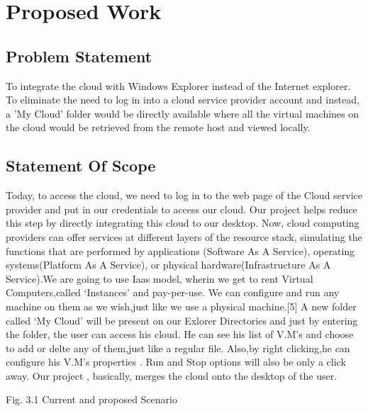 \chapter{Proposed Work}

\section{Problem Statement}
To integrate the cloud with Windows Explorer instead of the Internet explorer. To eliminate the need to log in into a cloud service provider account and instead, a 'My Cloud' folder would be directly available where all the virtual machines on the cloud would be retrieved from the remote host and viewed locally.



\section{Statement Of Scope}

  Today, to access the cloud, we need to log in to the web page of the Cloud service provider and put in our credentials to access our cloud. Our project helps reduce this step by directly integrating this cloud to our desktop.
Now, cloud computing providers can offer services at different layers of the resource stack, simulating the functions that are performed by applications (Software As A Service), operating systems(Platform As A Service), or physical hardware(Infrastructure As A Service).We are going to use Iaas model, wherin we get to rent Virtual Computers,called ‘Instances’ and pay-per-use. We can configure and run any machine on them as we wish,just like we use a physical machine.[5]
	A new folder called ‘My Cloud’ will be present on our Exlorer Directories and just by entering the folder, the user can access his cloud. He can see his list of V.M’s and choose to add or delte any of them,just like a regular file. Also,by right clicking,he can configure his V.M’s properties . Run and Stop options will also be only a click away.
Our project , basically, merges the cloud onto the desktop of the user.

 



 
Fig. 3.1 Current and proposed Scenario

















